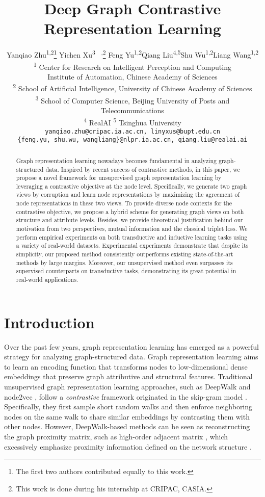 \documentclass{article}
\title{Deep Graph Contrastive Representation Learning}
\author{Yanqiao Zhu\textsuperscript{1,2}\thanks{The first two authors contributed equally to this work.} \quad Yichen Xu\textsuperscript{3}\footnotemark[1]\textsuperscript{~~,}\thanks{This work is done during his internship at CRIPAC, CASIA.} \quad Feng Yu\textsuperscript{1,2}\quad Qiang Liu\textsuperscript{4,5}\quad Shu Wu\textsuperscript{1,2}\quad Liang Wang\textsuperscript{1,2} \\
\textsuperscript{1} Center for Research on Intelligent Perception and Computing\\ Institute of Automation, Chinese Academy of Sciences\\
\textsuperscript{2} School of Artificial Intelligence, University of Chinese Academy of Sciences\\
\textsuperscript{3} School of Computer Science, Beijing University of Posts and Telecommunications\\
\textsuperscript{4} RealAI \quad \textsuperscript{5} Tsinghua University\\
\small\texttt{yanqiao.zhu@cripac.ia.ac.cn, linyxus@bupt.edu.cn}\\
\small\texttt{\{feng.yu, shu.wu, wangliang\}@nlpr.ia.ac.cn, qiang.liu@realai.ai} \\
}
\theoremstyle{remark}
\begin{document}
\maketitle

\begin{abstract}
Graph representation learning nowadays becomes fundamental in analyzing graph-structured data.
Inspired by recent success of contrastive methods, in this paper, we propose a novel framework for unsupervised graph representation learning by leveraging a contrastive objective at the node level. Specifically, we generate two graph views by corruption and learn node representations by maximizing the agreement of node representations in these two views. To provide diverse node contexts for the contrastive objective, we propose a hybrid scheme for generating graph views on both structure and attribute levels. Besides, we provide theoretical justification behind our motivation from two perspectives, mutual information and the classical triplet loss.
We perform empirical experiments on both transductive and inductive learning tasks using a variety of real-world datasets. Experimental experiments demonstrate that despite its simplicity, our proposed method consistently outperforms existing state-of-the-art methods by large margins. 
Moreover, our unsupervised method even surpasses its supervised counterparts on transductive tasks, demonstrating its great potential in real-world applications.

\end{abstract}

\section{Introduction}

Over the past few years, graph representation learning has emerged as a powerful strategy for analyzing graph-structured data. Graph representation learning aims to learn an encoding function that transforms nodes to low-dimensional dense embeddings that preserve graph attributive and structural features.
Traditional unsupervised graph representation learning approaches, such as DeepWalk \cite{Perozzi:2014ib} and node2vec \cite{Grover:2016ex}, follow a \emph{contrastive} framework originated in the skip-gram model \cite{Mikolov:2013uz}.
Specifically, they first sample short random walks and then enforce neighboring nodes on the same walk to share similar embeddings by contrasting them with other nodes. However, DeepWalk-based methods can be seen as reconstructing the graph proximity matrix, such as high-order adjacent matrix \cite{Qiu:2018ez}, which excessively emphasize proximity information defined on the network structure \cite{Ribeiro:2017ji}.
\end{document}
